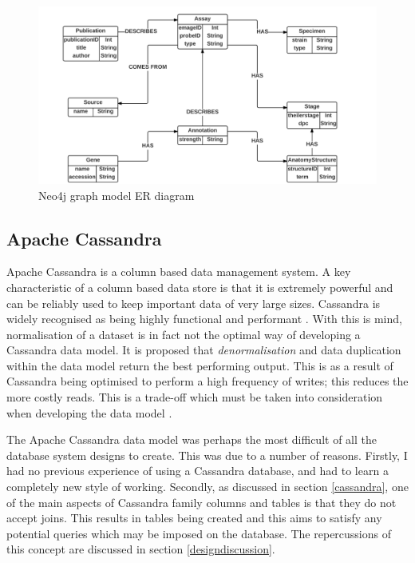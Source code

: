 \begin{figure}[H]\begin{center}\includegraphics[width=1\linewidth]{images/neo4j_model_er}\caption{Neo4j graph model ER diagram}\label{fig:neo1}\end{center}\end{figure}
\newpage
\subsection{Apache Cassandra}
Apache Cassandra is a column based data management system. A key characteristic of a column based data store is that it is extremely powerful and can be reliably used to keep important data of very large sizes. Cassandra is widely recognised as being highly functional and performant \cite{cassandra}. With this is mind, normalisation of a dataset is in fact not the optimal way of developing a Cassandra data model. It is proposed that \textit{denormalisation} and data duplication within the data model return the best performing output. This is as a result of Cassandra being optimised to perform a high frequency of writes; this reduces the more costly reads. This is a trade-off which must be taken into consideration when developing the data model \cite{cassandra}.

The Apache Cassandra data model was perhaps the most difficult of all the database system designs to create. This was due to a number of reasons. Firstly, I had no previous experience of using a Cassandra database, and had to learn a completely new style of working. Secondly, as discussed in section \ref{cassandra}, one of the main aspects of Cassandra family columns and tables is that they do not accept joins. This results in tables being created and this aims to satisfy any potential queries which may be imposed on the database. The repercussions of this concept are discussed in section \ref{designdiscussion}.

